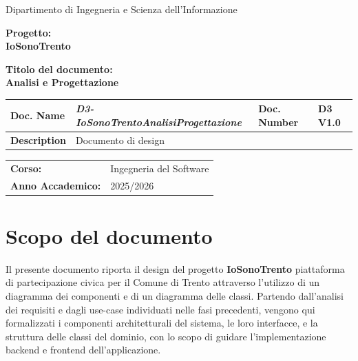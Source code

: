 \documentclass[12pt, a4paper]{article}
\begin{document}
\thispagestyle{empty}

\begin{center}
  \vspace*{1cm}

  {\large Dipartimento di Ingegneria e Scienza dell'Informazione}

  \vspace{2cm}

  \textbf{Progetto:}\\[0.3cm]
  {\LARGE \textbf{IoSonoTrento}}

  \vspace{1cm}

  \textbf{Titolo del documento:}\\[0.3cm]
  {\Large \textbf{Analisi e Progettazione}}

  \vspace{2cm}

  \begin{tabular}{|>{\bfseries}p{3.5cm}|p{5cm}|>{\bfseries}p{3cm}|p{2.5cm}|}
    \hline
    Doc. Name & \textit{D3-IoSonoTrentoAnalisiProgettazione} & Doc. Number & D3 V1.0 \\
    \hline
    Description & Documento di design & & \\
    \hline
  \end{tabular}

  \vspace{3cm}

  {\small
    \begin{tabular}{ll}
      \textbf{Corso:}  & Ingegneria del Software \\
      \textbf{Anno Accademico:} & 2025/2026 \\
    \end{tabular}
  }
\end{center}

\newpage

\tableofcontents
\newpage

\section*{Scopo del documento}

Il presente documento riporta il design del progetto \textbf{IoSonoTrento} piattaforma
di partecipazione civica per il Comune di Trento attraverso l'utilizzo di un diagramma dei
componenti e di un diagramma delle classi. Partendo dall'analisi dei requisiti e dagli use-case
individuati nelle fasi precedenti, vengono qui formalizzati i componenti architetturali del sistema,
le loro interfacce, e la struttura delle classi del dominio, con lo scopo di guidare l'implementazione
backend e frontend dell'applicazione.
\end{document}
